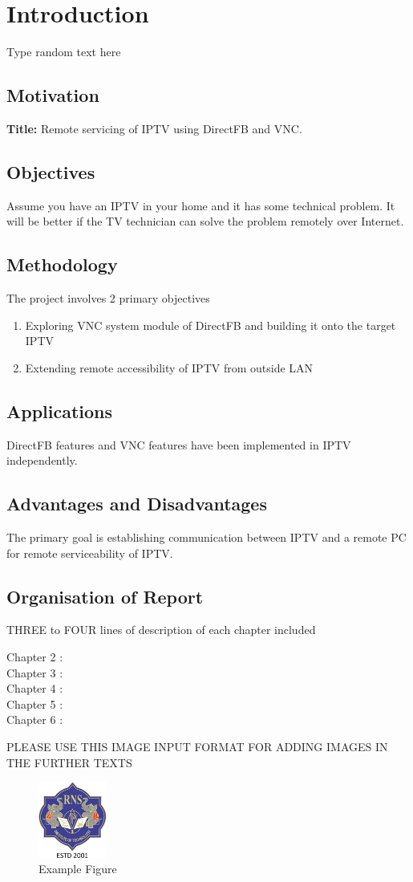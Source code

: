 \chapter{Introduction}
Type random text here
\section{Motivation}
\textbf{Title:} Remote servicing of IPTV using DirectFB and VNC.

\section{Objectives}
Assume you have an IPTV in your home and it has some technical problem. It will be better if the TV technician can solve the problem remotely over Internet. 

\section{Methodology}
The project involves 2 primary objectives
\begin{enumerate}
\item Exploring VNC system module of DirectFB and building it onto the target IPTV
\item Extending remote accessibility of IPTV from outside LAN
\end{enumerate}

\section{Applications}
DirectFB features and VNC features have been implemented in IPTV independently.

\section{Advantages and Disadvantages}
The primary goal is establishing communication between IPTV and a remote PC for remote serviceability of IPTV.\\

\section{Organisation of Report}

THREE to FOUR lines of description of each chapter included
\begin{description}
	\item[Chapter 2 :] 
	\item[Chapter 3 :] 
	\item[Chapter 4 :]
	\item[Chapter 5 :]
	\item[Chapter 6 :]
\end{description}



PLEASE USE THIS IMAGE INPUT FORMAT FOR ADDING IMAGES IN THE FURTHER TEXTS

\begin{figure}[h]
	\centering
	\includegraphics[height=2.5cm]{images/rns1.jpg}
	\caption{Example Figure}
	\label{1}
\end{figure}


